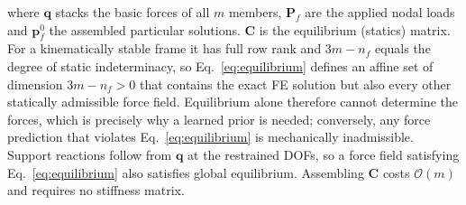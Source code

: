 where $\mathbf{q}$ stacks the basic forces of all $m$ members, $\mathbf{P}_f$ are the applied nodal loads and $\mathbf{p}^0_f$ the assembled particular solutions. $\mathbf{C}$ is the equilibrium (statics) matrix. For a kinematically stable frame it has full row rank and $3m-n_f$ equals the degree of static indeterminacy, so Eq.~\eqref{eq:equilibrium} defines an affine set of dimension $3m-n_f>0$ that contains the exact FE solution but also every other statically admissible force field. Equilibrium alone therefore cannot determine the forces, which is precisely why a learned prior is needed; conversely, any force prediction that violates Eq.~\eqref{eq:equilibrium} is mechanically inadmissible. Support reactions follow from $\mathbf{q}$ at the restrained DOFs, so a force field satisfying Eq.~\eqref{eq:equilibrium} also satisfies global equilibrium. Assembling $\mathbf{C}$ costs $\mathcal{O}(m)$ and requires no stiffness matrix.

